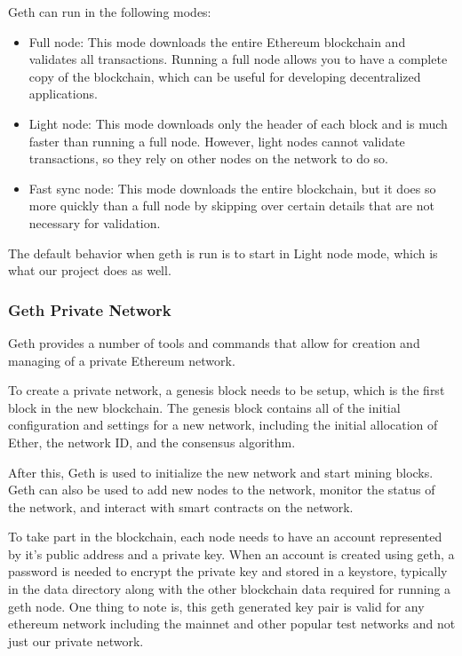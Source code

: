 \documentclass{article}
\begin{document}
Geth can run in the following modes:

\begin{itemize}
    \item Full node: This mode downloads the entire Ethereum blockchain and validates all transactions. Running a full node allows you to have a complete copy of the blockchain, which can be useful for developing decentralized applications.
    \item Light node: This mode downloads only the header of each block and is much faster than running a full node. However, light nodes cannot validate transactions, so they rely on other nodes on the network to do so.
    \item Fast sync node: This mode downloads the entire blockchain, but it does so more quickly than a full node by skipping over certain details that are not necessary for validation.
\end{itemize}
The default behavior when geth is run is to start in Light node mode, which is what our project does as well.

\subsubsection{Geth Private Network}
Geth provides a number of tools and commands that allow for creation and managing of a private Ethereum network.

To create a private network, a genesis block needs to be setup, which is the first block in the new blockchain. The genesis block contains all of the initial configuration and settings for a new network, including the initial allocation of Ether, the network ID, and the consensus algorithm.

After this, Geth is used to initialize the new network and start mining blocks. Geth can also be used to add new nodes to the network, monitor the status of the network, and interact with smart contracts on the network.

To take part in the blockchain, each node needs to have an account represented by it's public address and a private key. When an account is created using geth, a password is needed to encrypt the private key and stored in a keystore, typically in the data directory along with the other blockchain data required for running a geth node. One thing to note is, this geth generated key pair is valid for any ethereum network including the mainnet and other popular test networks and not just our private network.
\end{document}
